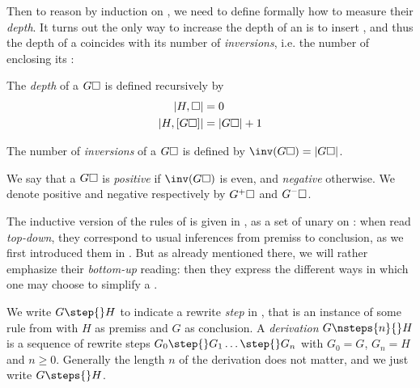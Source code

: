 \begin{scope}
Then to reason by induction on , we need to define formally how to
measure their \emph{depth}. It turns out the only way to increase the depth of
an  is to insert \emph{}, and thus the depth of a
 coincides with its number of \emph{inversions}, i.e. the number of
 enclosing its :

\begin{definition}[Depth]
  The \emph{depth} of a  $G\square$ is defined recursively by
  \begin{align*}
    \left|H, \square\right| &= 0 \\
    \left|H, [G\square]\right| &= \left|G\square\right| + 1
  \end{align*}
\end{definition}

\begin{definition}[Inversions]

  The number of \emph{inversions} of a  $G\square$ is defined by
  $\inv(G\hole) = \gdepth{G\hole}$.
\end{definition}

\begin{definition}[Polarity]
  We say that a  $G\square$ is \emph{positive} if $\inv(G\hole)$ is
  even, and \emph{negative} otherwise. We denote positive and negative 
  respectively by $G^+\square$ and $G^-\square$.
\end{definition}

The inductive version of the rules of  is given in , as
a set of unary  on : when read \emph{top-down},
they correspond to usual inferences from premiss to conclusion, as we first
introduced them in .
But as already mentioned there, we will rather emphasize their \emph{bottom-up}
reading: then they express the different ways in which one may choose to
simplify a .

\begin{definition}[Derivation]
  We write $G \step{} H$ to indicate a rewrite \emph{step} in , that is
  an instance of some rule from  with $H$ as premiss and $G$ as
  conclusion. A \emph{derivation} $G \nsteps{n}{} H$ is a sequence of rewrite
  steps $G_0 \step{} G_1 \ldots \step{} G_n$ with $G_0 = G$, $G_n = H$ and $n \geq
  0$. Generally the length $n$ of the derivation does not matter, and we just
  write $G \steps{} H$.
\end{definition}


\end{scope}
